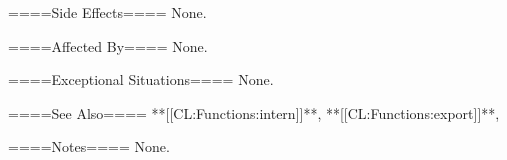 ====Side Effects====
None.

====Affected By====
None.

====Exceptional Situations====
None.

====See Also====
**[[CL:Functions:intern]]**, **[[CL:Functions:export]]**,

{\secref\TraversalRules}


====Notes====
None.

    
